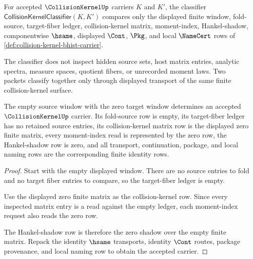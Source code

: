 \begin{definition}
\label{def:collision-kernel-classifier}
For accepted $\CollisionKernelUp$ carriers $K$ and $K'$, the classifier $\mathsf{CollisionKernelClassifier}(K,K')$ compares only the displayed finite window, fold-source, target-fiber ledger, collision-kernel matrix, moment-index, Hankel-shadow, componentwise $\hsame$, displayed $\Cont$, $\Pkg$, and local $\NameCert$ rows of \autoref{def:collision-kernel-bhist-carrier}.

The classifier does not inspect hidden source sets, host matrix entries, analytic spectra, measure spaces, quotient fibers, or unrecorded moment laws. Two packets classify together only through displayed transport of the same finite collision-kernel surface.
\end{definition}

\begin{theorem}
\label{thm:collision-kernel-zero-window-packet}
The empty source window with the zero target window determines an accepted $\CollisionKernelUp$ carrier. Its fold-source row is empty, its target-fiber ledger has no retained source entries, its collision-kernel matrix row is the displayed zero finite matrix, every moment-index read is represented by the zero row, the Hankel-shadow row is zero, and all transport, continuation, package, and local naming rows are the corresponding finite identity rows.
\end{theorem}
\begin{proof}
Start with the empty displayed window. There are no source entries to fold and no target fiber entries to compare, so the target-fiber ledger is empty.

Use the displayed zero finite matrix as the collision-kernel row. Since every inspected matrix entry is a read against the empty ledger, each moment-index request also reads the zero row.

The Hankel-shadow row is therefore the zero shadow over the empty finite matrix. Repack the identity $\hsame$ transports, identity $\Cont$ routes, package provenance, and local naming row to obtain the accepted carrier.
\end{proof}


